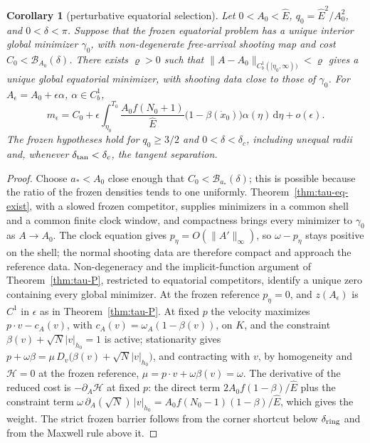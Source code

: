 \documentclass[aip,jmp,amsmath,amssymb,reprint]{revtex4-2}
\newcommand{\Ehat}{\hat E}
\newcommand{\dd}{\mathrm{d}}
\theoremstyle{plain}
\newtheorem{corollary}[proposition]{Corollary}
\theoremstyle{definition}
\begin{document}
\begin{corollary}[perturbative equatorial selection]\label{cor:tau-eq-P}
Let $0<A_0<\Ehat$, $q_0=\Ehat^2/A_0^2$, and $0<\delta<\pi$. Suppose that the frozen equatorial problem has a unique interior
global minimizer $\gamma_0$, with non-degenerate free-arrival shooting map and cost
$C_0<\mathcal B_{A_0}(\delta)$. There exists $\varrho>0$ such that $\|A-A_0\|_{C^1_b([\eta_0,\infty))}<\varrho$ gives a
unique global equatorial minimizer, with shooting data close to those of $\gamma_0$. For
$A_\epsilon=A_0+\epsilon\alpha$, $\alpha\in C^1_b$,
\[
  m_\epsilon=C_0+\epsilon\int_{\eta_0}^{T_0}\frac{A_0f(N_0+1)}{\Ehat}\bigl(1-\beta(\dot x_0)\bigr)\alpha(\eta)\,\dd\eta+o(\epsilon).
\]
The frozen hypotheses hold for $q_0\ge3/2$ and $0<\delta<\delta_c$, including unequal radii and, whenever
$\delta_{\rm tan}<\delta_c$, the tangent separation.
\end{corollary}

\begin{proof}
Choose $a_*<A_0$ close enough that $C_0<\mathcal B_{a_*}(\delta)$; this is possible because the ratio of
the frozen densities tends to one uniformly. Theorem~\ref{thm:tau-eq-exist}, with a slowed frozen
competitor, supplies minimizers in a common shell and a common finite clock window, and
compactness brings every minimizer to $\gamma_0$ as $A\to A_0$. The clock equation gives
$p_\eta=O(\|A'\|_\infty)$, so $\omega-p_\eta$ stays positive on the shell; the normal shooting data are therefore
compact and approach the reference data. Non-degeneracy and the implicit-function argument of
Theorem~\ref{thm:tau-P}, restricted to equatorial competitors, identify a unique zero containing
every global minimizer. At the frozen reference $p_\eta=0$, and $z(A_\epsilon)$ is $C^1$ in $\epsilon$ as in Theorem~\ref{thm:tau-P}. At fixed $p$ the velocity maximizes $p\cdot v-c_A(v)$, with $c_A(v)=\omega_A(1-\beta(v))$, on $K$, and the
constraint $\beta(v)+\sqrt N|v|_{h_0}=1$ is active; stationarity gives
$p+\omega\beta=\mu\,D_v\bigl(\beta(v)+\sqrt N|v|_{h_0}\bigr)$, and contracting with $v$, by homogeneity and
$\mathcal H=0$ at the frozen reference, $\mu=p\cdot v+\omega\beta(v)=\omega$. The derivative of the reduced cost is
$-\partial_A\mathcal H$ at fixed $p$: the direct term $2A_0f(1-\beta)/\Ehat$ plus the constraint term
$\omega\,\partial_A(\sqrt N)\,|v|_{h_0}=A_0f(N_0-1)(1-\beta)/\Ehat$, which gives the weight. The strict frozen barrier follows from the corner shortcut below
$\delta_{\rm ring}$ and from the Maxwell rule above it.
\end{proof}
\end{document}
